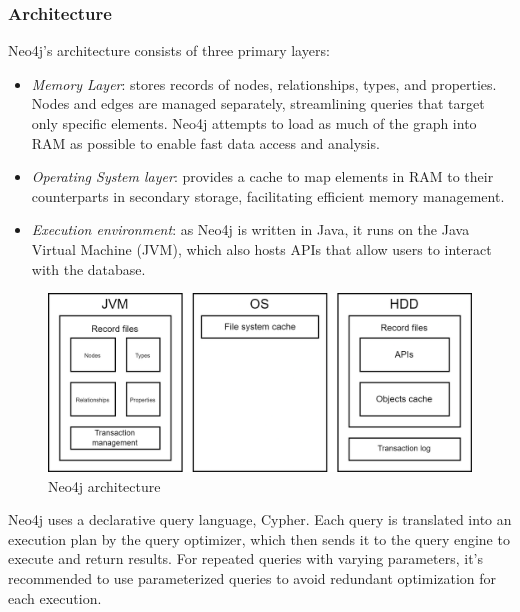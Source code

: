 \subsubsection{Architecture}
Neo4j's architecture consists of three primary layers:
\begin{itemize}
    \item \textit{Memory Layer}: stores records of nodes, relationships, types, and properties. 
        Nodes and edges are managed separately, streamlining queries that target only specific elements. 
        Neo4j attempts to load as much of the graph into RAM as possible to enable fast data access and analysis.
    \item \textit{Operating System layer}: provides a cache to map elements in RAM to their counterparts in secondary storage, facilitating efficient memory management.
    \item \textit{Execution environment}: as Neo4j is written in Java, it runs on the Java Virtual Machine (JVM), which also hosts APIs that allow users to interact with the database.
\end{itemize}
\begin{figure}[H]
    \centering
    \includegraphics[width=0.65\linewidth]{images/neo4j.png}
    \caption{Neo4j architecture}
\end{figure}
Neo4j uses a declarative query language, Cypher. 
Each query is translated into an execution plan by the query optimizer, which then sends it to the query engine to execute and return results. 
For repeated queries with varying parameters, it's recommended to use parameterized queries to avoid redundant optimization for each execution.

